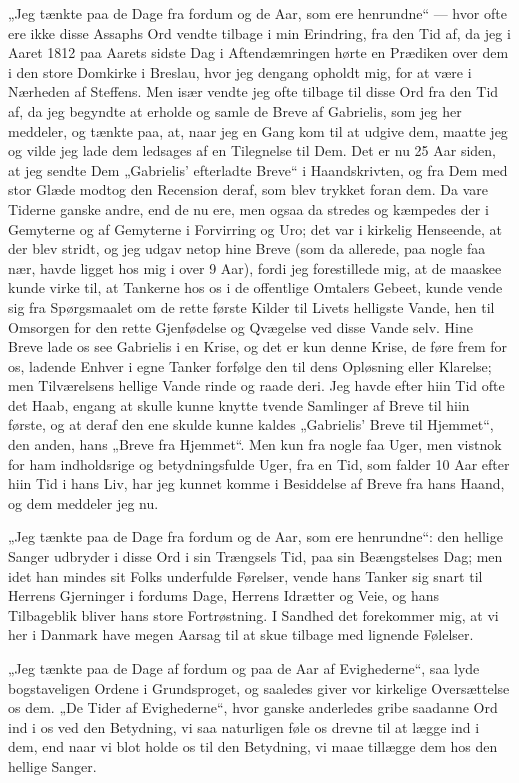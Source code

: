 \documentclass[12pt,a4paper]{book}
\begin{document}
„Jeg tænkte paa de Dage fra fordum og de Aar, som ere henrundne“ ---
hvor ofte ere ikke disse Assaphs Ord vendte tilbage i min Erindring,
fra den Tid af, da jeg i Aaret 1812 paa Aarets sidste Dag i
Aftendæmringen hørte en Prædiken over dem i den store Domkirke i
Breslau, hvor jeg dengang opholdt mig, for at være i Nærheden af
Steffens. Men især vendte jeg ofte tilbage til disse Ord fra den Tid
af, da jeg begyndte at erholde og samle de Breve af Gabrielis, som jeg
her meddeler, og tænkte paa, at, naar jeg en Gang kom til at udgive
dem, maatte jeg og vilde jeg lade dem ledsages af en Tilegnelse til
Dem. Det er nu 25 Aar siden, at jeg sendte Dem „Gabrielis' efterladte
Breve“ i Haandskrivten, og fra Dem med stor Glæde modtog den Recension
deraf, som blev trykket foran dem. Da vare Tiderne ganske andre, end
de nu ere, men ogsaa da stredes og kæmpedes der i Gemyterne og af
Gemyterne i Forvirring og Uro; det var i kirkelig Henseende, at der
blev stridt, og jeg udgav netop hine Breve (som da allerede, paa nogle
faa nær, havde ligget hos mig i over 9 Aar), fordi jeg forestillede
mig, at de maaskee kunde virke til, at Tankerne hos os i de offentlige
Omtalers Gebeet, kunde vende sig fra Spørgsmaalet om de rette første
Kilder til Livets helligste Vande, hen til Omsorgen for den rette
Gjenfødelse og Qvægelse ved disse Vande selv. Hine Breve lade os see
Gabrielis i en Krise, og det er kun denne Krise, de føre frem for os,
ladende Enhver i egne Tanker forfølge den til dens Opløsning eller
Klarelse; men Tilværelsens hellige Vande rinde og raade deri. Jeg
havde efter hiin Tid ofte det Haab, engang at skulle kunne knytte
tvende Samlinger af Breve til hiin første, og at deraf den ene skulde
kunne kaldes „Gabrielis' Breve til Hjemmet“, den anden, hans „Breve fra
Hjemmet“. Men kun fra nogle faa Uger, men vistnok for ham indholdsrige
og betydningsfulde Uger, fra en Tid, som falder 10 Aar efter hiin Tid i
hans Liv, har jeg kunnet komme i Besiddelse af Breve fra hans Haand, og
dem meddeler jeg nu.

„Jeg tænkte paa de Dage fra fordum og de Aar, som ere henrundne“: den
hellige Sanger udbryder i disse Ord i sin Trængsels Tid, paa sin
Beængstelses Dag; men idet han mindes sit Folks underfulde Førelser,
vende hans Tanker sig snart til Herrens Gjerninger i fordums Dage,
Herrens Idrætter og Veie, og hans Tilbageblik bliver hans store
Fortrøstning. I Sandhed det forekommer mig, at vi her i Danmark have
megen Aarsag til at skue tilbage med lignende Følelser.

„Jeg tænkte paa de Dage af fordum og paa de Aar af Evighederne“, saa
lyde bogstaveligen Ordene i Grundsproget, og saaledes giver vor
kirkelige Oversættelse os dem. „De Tider af Evighederne“, hvor ganske
anderledes gribe saadanne Ord ind i os ved den Betydning, vi saa
naturligen føle os drevne til at lægge ind i dem, end naar vi blot
holde os til den Betydning, vi maae tillægge dem hos den hellige
Sanger.
\end{document}
